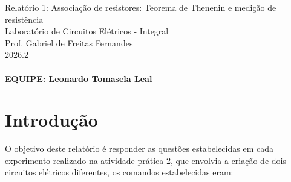 \documentclass[a4paper,oneside,10pt]{article}
\begin{document}
\noindent Relatório 1: Associação de resistores: Teorema de Thenenin e medição de resistência \\
Laboratório de Circuitos Elétricos - Integral\\
Prof. Gabriel de Freitas Fernandes\\
2026.2\\
\\
\textbf{EQUIPE: Leonardo Tomasela Leal}
\\

\section{Introdução}

O objetivo deste relatório é responder as questões estabelecidas em cada experimento realizado na atividade prática 2, que envolvia a criação de dois circuitos elétricos diferentes, os comandos estabelecidas eram:
\end{document}
